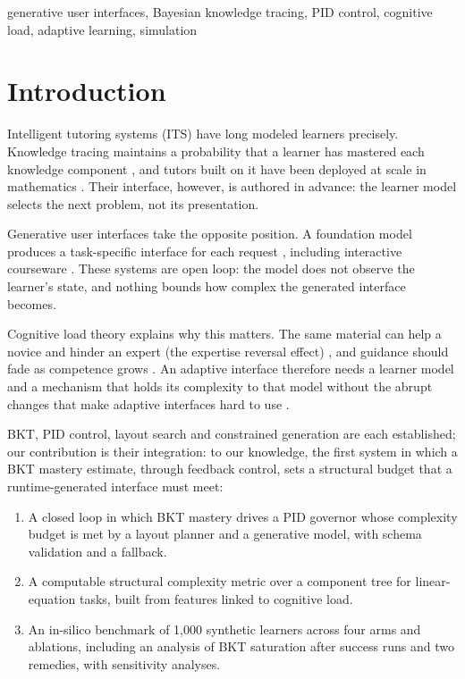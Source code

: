 \documentclass[conference]{IEEEtran}
\begin{document}
\begin{IEEEkeywords}
generative user interfaces, Bayesian knowledge tracing, PID control,
cognitive load, adaptive learning, simulation
\end{IEEEkeywords}

\section{Introduction}

Intelligent tutoring systems (ITS) have long modeled learners precisely.
Knowledge tracing maintains a probability that a learner has mastered each
knowledge component \cite{corbett1995knowledge}, and
tutors built on it have been deployed at scale in mathematics
\cite{ritter2007cognitive,vanlehn2011relative}. Their interface,
however, is authored in advance: the learner model selects the next problem,
not its presentation.

Generative user interfaces take the opposite position. A foundation model
produces a task-specific interface for each request
\cite{leviathan2026genui}, including interactive courseware
\cite{tu2026maicui}. These systems are open loop: the model does not observe
the learner's state, and nothing bounds how complex the generated interface
becomes.

Cognitive load theory explains why this matters. The same material can help
a novice and hinder an expert (the expertise reversal effect)
\cite{kalyuga2003expertise}, and guidance should fade as
competence grows \cite{renkl2003structuring,salden2010expertise}. An
adaptive interface therefore needs a learner model and a mechanism that holds
its complexity to that model without the abrupt changes that make adaptive
interfaces hard to use \cite{gajos2008predictability,findlater2004menus}.

BKT, PID control, layout search and constrained generation are each
established; our contribution is their integration: to our knowledge, the first
system in which a BKT mastery estimate, through feedback control, sets a
structural budget that a runtime-generated interface must meet:
\begin{enumerate}
\item A closed loop in which BKT mastery drives a PID governor whose
complexity budget is met by a layout planner and a generative model, with
schema validation and a fallback.
\item A computable structural complexity metric over a component tree for
linear-equation tasks, built from features linked to cognitive load.
\item An in-silico benchmark of 1,000 synthetic learners across four arms
and ablations, including an analysis of BKT saturation after success runs
and two remedies, with sensitivity analyses.
\end{enumerate}
\end{document}
